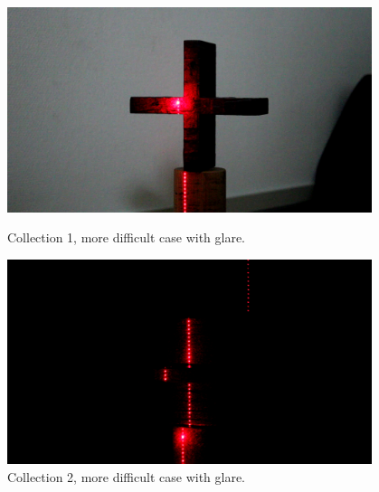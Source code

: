 \begin{figure}[h!]
    \centering
    \begin{minipage}[t]{0.48\textwidth}
        \centering
        \includegraphics[width=0.95\textwidth]{figures/ImageAnalysis/cross1_glare.png}
        \caption{Collection 1, more difficult case with glare.}
    \label{fig:cross1_glare}
    \end{minipage}%
    \hspace{.03\textwidth}
    \begin{minipage}[t]{0.48\textwidth}
        \centering
        \includegraphics[width=0.95\textwidth]{figures/ImageAnalysis/cross2_glare.png}
        \caption{Collection 2, more difficult case with glare.}
        \label{fig:cross2_glare}
    \end{minipage}
\end{figure}
\FloatBarrier


